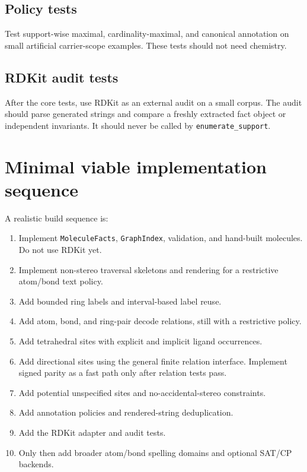 \documentclass[10pt,a4paper]{article}
\theoremstyle{definition}
\theoremstyle{remark}
\begin{document}
\subsection{Policy tests}

Test support-wise maximal, cardinality-maximal, and canonical annotation on small
artificial carrier-scope examples.  These tests should not need chemistry.

\subsection{RDKit audit tests}

After the core tests, use RDKit as an external audit on a small corpus.  The
audit should parse generated strings and compare a freshly extracted fact object
or independent invariants.  It should never be called by
\texttt{enumerate\_support}.

\section{Minimal viable implementation sequence}
\label{s:mvp}

A realistic build sequence is:
\begin{enumerate}[leftmargin=*]
\item Implement \texttt{MoleculeFacts}, \texttt{GraphIndex}, validation, and
      hand-built molecules.  Do not use RDKit yet.
\item Implement non-stereo traversal skeletons and rendering for a restrictive
      atom/bond text policy.
\item Add bounded ring labels and interval-based label reuse.
\item Add atom, bond, and ring-pair decode relations, still with a restrictive
      policy.
\item Add tetrahedral sites with explicit and implicit ligand occurrences.
\item Add directional sites using the general finite relation interface.
      Implement signed parity as a fast path only after relation tests pass.
\item Add potential unspecified sites and no-accidental-stereo constraints.
\item Add annotation policies and rendered-string deduplication.
\item Add the RDKit adapter and audit tests.
\item Only then add broader atom/bond spelling domains and optional SAT/CP
      backends.
\end{enumerate}
\end{document}
